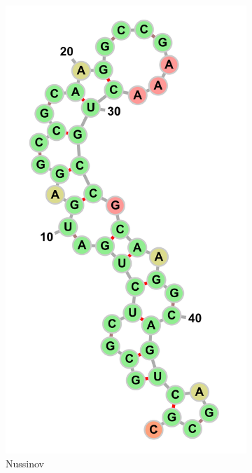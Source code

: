 \documentclass[10pt]{article}
\begin{document}
\begin{figure}[p]
    \begin{subfigure}[b]{0.2\linewidth}
        \includegraphics[width=\linewidth]{./img/hammerhead_ribozyme_nussinov.png}
        \caption{Nussinov}
    \end{subfigure}
    \begin{subfigure}[b]{0.4\linewidth}

\end{subfigure}
\end{figure}
\end{document}
